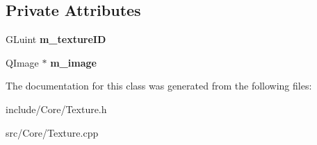 \subsection*{Private Attributes}
\begin{DoxyCompactItemize}
\item 
\hypertarget{class_texture_aa784269ecba9d590f8b046af7232cf36}{G\-Luint {\bfseries m\-\_\-texture\-I\-D}}\label{class_texture_aa784269ecba9d590f8b046af7232cf36}

\item 
\hypertarget{class_texture_a76b2154e95fb53e0d98c8a3dc0c5d326}{Q\-Image $\ast$ {\bfseries m\-\_\-image}}\label{class_texture_a76b2154e95fb53e0d98c8a3dc0c5d326}

\end{DoxyCompactItemize}


The documentation for this class was generated from the following files\-:\begin{DoxyCompactItemize}
\item 
include/\-Core/Texture.\-h\item 
src/\-Core/Texture.\-cpp\end{DoxyCompactItemize}
